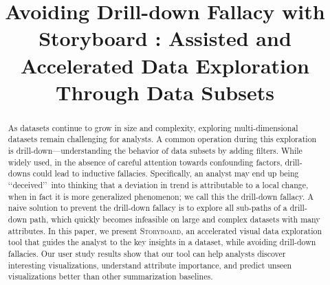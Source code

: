 \documentclass{sigchi}
\newcommand{\system}{\textsc{Storyboard}\xspace}
\begin{document}
\title{Avoiding Drill-down Fallacy with Storyboard : Assisted and Accelerated Data Exploration Through Data Subsets}
\maketitle
\begin{abstract}
As datasets continue to grow in size and complexity, exploring multi-dimensional datasets remain challenging for analysts. A common operation during this exploration is drill-down---understanding the behavior of data subsets by adding filters. While widely used, in the absence of careful attention towards confounding factors, drill-downs could lead to inductive fallacies. Specifically, an analyst may end up being \lq\lq deceived\rq\rq\ into thinking that a deviation in trend is attributable to a local change, when in fact it is more generalized phenomenon; we call this the drill-down fallacy. A naive solution to prevent the drill-down fallacy is to explore all sub-paths of a drill-down path, which quickly becomes infeasible on large and complex datasets with many attributes. In this paper, we present \system, an accelerated visual data exploration tool that guides the analyst to the key insights in a dataset, while avoiding drill-down fallacies. Our user study results show that our tool can help analysts discover interesting visualizations, understand attribute importance, and predict unseen visualizations better than other summarization baselines.
\end{abstract}
\end{document}
